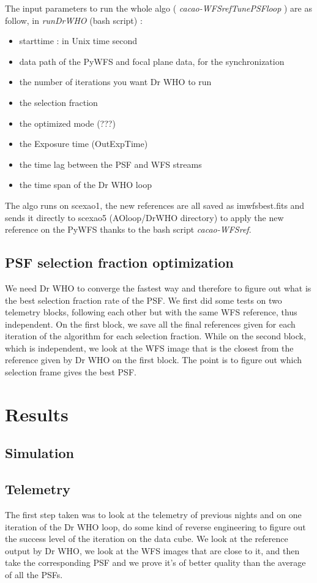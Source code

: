 \documentclass[twocolumn]{aastex62}
\begin{document}
The input parameters to run the whole algo ( \textit{cacao-WFSrefTunePSFloop} ) are as follow, in \textit{runDrWHO} (bash script) : 
\begin{itemize}[noitemsep,nolistsep]
    \item starttime : in Unix time second
    \item data path of the PyWFS and focal plane data, for the synchronization 
    \item the number of iterations you want Dr WHO to run 
    \item the selection fraction
    \item the optimized mode (???)
    \item the Exposure time (OutExpTime)
    \item the time lag between the PSF and WFS streams
    \item the time span of the Dr WHO loop 
\end{itemize}

The algo runs on scexao1, the new references are all saved as imwfsbest.fits and sends it directly to scexao5 (AOloop/DrWHO directory) to apply the new reference on the PyWFS thanks to the bash script \textit{cacao-WFSref}.  


\subsection{PSF selection fraction optimization}
We need Dr WHO to converge the fastest way and therefore to figure out what is the best selection fraction rate of the PSF. We first did some tests on two telemetry blocks, following each other but with the same WFS reference, thus independent. On the first block, we save all the final references given for each iteration of the algorithm for each selection fraction. While on the second block, which is independent, we look at the WFS image that is the closest from the reference given by Dr WHO on the first block. The point is to figure out which selection frame gives the best PSF. 


\section{Results}

\subsection{Simulation}
\subsection{Telemetry}
The first step taken was to look at the telemetry of previous nights and on one iteration of the Dr WHO loop, do some kind of reverse engineering to figure out the success level of the iteration on the data cube. We look at the reference output by Dr WHO, we look at the WFS images that are close to it, and then take the corresponding PSF and we prove it's of better quality than the average of all the PSFs. 
\end{document}
